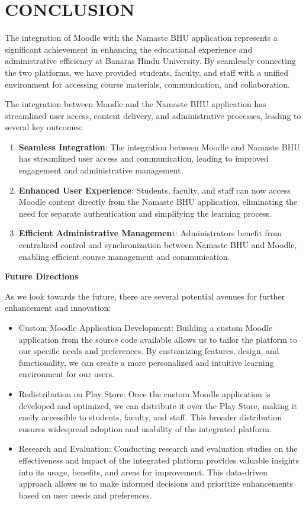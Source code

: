 \clearpage
\chapter{CONCLUSION}
The integration of Moodle with the Namaste BHU application represents a significant achievement in enhancing the educational experience and administrative efficiency at Banaras Hindu University. By seamlessly connecting the two platforms, we have provided students, faculty, and staff with a unified environment for accessing course materials, communication, and collaboration.

The integration between Moodle and the Namaste BHU application has streamlined user access, content delivery, and administrative processes, leading to several key outcomes:

\begin{enumerate}
    \item \textbf{Seamless Integration}: The integration between Moodle and Namaste BHU has streamlined user access and communication, leading to improved engagement and administrative management.
    \item \textbf{Enhanced User Experience}: Students, faculty, and staff can now access Moodle content directly from the Namaste BHU application, eliminating the need for separate authentication and simplifying the learning process.
    \item \textbf{Efficient Administrative Managemen}t: Administrators benefit from centralized control and synchronization between Namaste BHU and Moodle, enabling efficient course management and communication.
\end{enumerate}

\textbf{Future Directions}

As we look towards the future, there are several potential avenues for further enhancement and innovation:

\begin{itemize}
    \item Custom Moodle Application Development: Building a custom Moodle application from the source code available allows us to tailor the platform to our specific needs and preferences. By customizing features, design, and functionality, we can create a more personalized and intuitive learning environment for our users.
    \item Redistribution on Play Store: Once the custom Moodle application is developed and optimized, we can distribute it over the Play Store, making it easily accessible to students, faculty, and staff. This broader distribution ensures widespread adoption and usability of the integrated platform.
    \item Research and Evaluation: Conducting research and evaluation studies on the effectiveness and impact of the integrated platform provides valuable insights into its usage, benefits, and areas for improvement. This data-driven approach allows us to make informed decisions and prioritize enhancements based on user needs and preferences.
\end{itemize}
